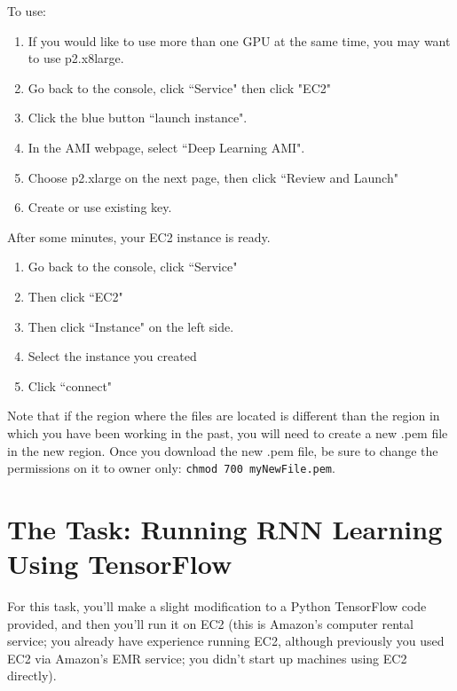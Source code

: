 \documentclass[11pt]{article}
\renewcommand\:{\colon} %
\begin{document}
To use:
\begin{enumerate}
\item If you would like to use more than one GPU at the same time, you may want to use p2.x8large.
\item Go back to the console, click ``Service" then click "EC2"
\item Click the blue button ``launch instance".
\item In the AMI webpage, select ``Deep Learning AMI".
\item Choose p2.xlarge on the next page, then click ``Review and Launch"
\item Create or use existing key.
\end{enumerate}

After some minutes, your EC2 instance is ready. \\

\begin{enumerate}
\item Go back to the console, click ``Service" 
\item Then click ``EC2"
\item Then click ``Instance" on the left side. 
\item Select the instance you created
\item Click ``connect"
\end{enumerate}

Note that if the region where the files are located is different than the region in which you have been working in the past, you will need to create a new .pem file in the new region. Once you download the new .pem file, be sure to change the permissions on it to owner only: \texttt{chmod 700 myNewFile.pem}.

\section{The Task: Running RNN Learning Using TensorFlow}

For this task, you'll make a slight modification to a Python TensorFlow code provided, and then
you'll run it on EC2 (this is Amazon's computer rental service; you already have experience running EC2,
although previously you used EC2 via Amazon's EMR service; you didn't start up machines using EC2
directly).
\end{document}
